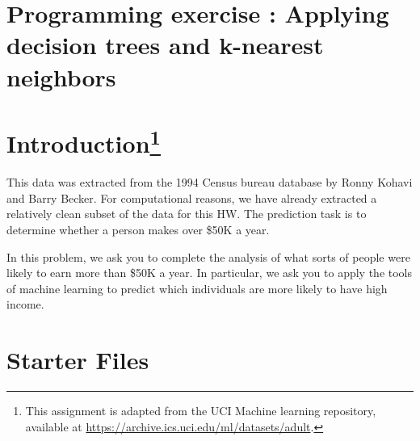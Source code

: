 \newpage
\section{Programming exercise : Applying decision trees and k-nearest neighbors }

\ifsoln
\else

\section*{Introduction\footnote{This assignment is adapted from the UCI Machine learning repository, available at \url{https://archive.ics.uci.edu/ml/datasets/adult}.}}

This data was extracted from the 1994 Census bureau database by Ronny Kohavi and Barry Becker. For computational reasons, we have already extracted a relatively clean subset of the data for this HW. The prediction task is to determine whether a person makes over \$50K a year.

In this problem, we ask you to complete the analysis of what sorts of people were likely to earn more than \$50K a year. In particular, we ask you to apply the tools of machine learning to predict which individuals are more likely to have high income. 


\section*{Starter Files}

